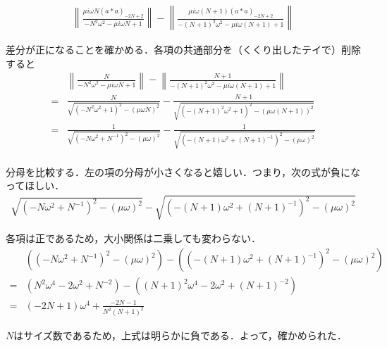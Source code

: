 \documentclass[11pt,a4paper,titlepage]{jsreport}
\theoremstyle{definition}
\begin{document}
\begin{equation}
  \begin{split}
    \left\| \frac{\mu i \omega N (a*a)_{-2N+2}}{-N^2 \omega^2 - \mu i \omega N + 1} \right\| - \left\| \frac{\mu i \omega (N+1) (a*a)_{-2N+2}}{-(N+1)^2 \omega^2 - \mu i \omega (N+1) + 1} \right\|
  \end{split}
\end{equation}

差分が正になることを確かめる．各項の共通部分を（くくり出したテイで）削除すると
\begin{equation}
  \begin{split}
    &\left\| \frac{N}{-N^2 \omega^2 - \mu i \omega N + 1} \right\| - \left\| \frac{N+1}{-(N+1)^2 \omega^2 - \mu i \omega (N+1) + 1} \right\| \\
    = &  \frac{N}{\sqrt{(-N^2 \omega^2 + 1 )^2- (\mu \omega N)^2}}  -  \frac{N+1}{\sqrt{(-(N+1)^2 \omega^2 + 1 )^2- (\mu \omega (N+1))^2}}  \\
    = &  \frac{1}{\sqrt{(-N \omega^2 + N^{-1} )^2- (\mu \omega)^2}}  -  \frac{1}{\sqrt{(-(N+1) \omega^2 + (N+1)^{-1} )^2- (\mu \omega)^2}}  \\
  \end{split}
\end{equation}

分母を比較する．左の項の分母が小さくなると嬉しい．つまり，次の式が負になってほしい．
\begin{equation}
  \begin{split}
    \sqrt{(-N \omega^2 + N^{-1} )^2- (\mu \omega)^2}  -  \sqrt{(-(N+1) \omega^2 + (N+1)^{-1} )^2- (\mu \omega)^2}
  \end{split}
\end{equation}

各項は正であるため，大小関係は二乗しても変わらない．
\begin{equation}
  \begin{split}
    &((-N \omega^2 + N^{-1} )^2 - (\mu \omega)^2) - ((-(N+1) \omega^2 + (N+1)^{-1} )^2- (\mu \omega)^2) \\
    = & (N^2 \omega^4 - 2 \omega^2 + N^{-2} ) - ((N+1)^2\omega^4 -2 \omega^2 + (N+1)^{-2}) \\
    = & (-2N+1)\omega^4 + \frac{-2N-1}{N^2(N+1)^2}
  \end{split}
\end{equation}

$N$はサイズ数であるため，上式は明らかに負である．よって，確かめられた．


\end{document}
